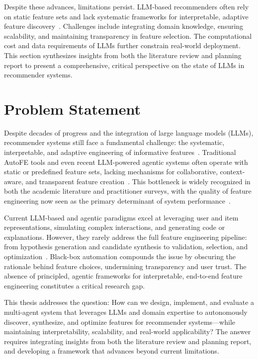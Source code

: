 Despite these advances, limitations persist. LLM-based recommenders often rely on static feature sets and lack systematic frameworks for interpretable, adaptive feature discovery~\cite{litterature_review}. Challenges include integrating domain knowledge, ensuring scalability, and maintaining transparency in feature selection. The computational cost and data requirements of LLMs further constrain real-world deployment. This section synthesizes insights from both the literature review and planning report to present a comprehensive, critical perspective on the state of LLMs in recommender systems.


\section{Problem Statement}
Despite decades of progress and the integration of large language models (LLMs), recommender systems still face a fundamental challenge: the systematic, interpretable, and adaptive engineering of informative features~\cite{litterature_review,Planning_Report}. Traditional AutoFE tools and even recent LLM-powered agentic systems often operate with static or predefined feature sets, lacking mechanisms for collaborative, context-aware, and transparent feature creation~\cite{Kanter2015Featuretools,Zou2025FEBP,Wang2024RecMind}. This bottleneck is widely recognized in both the academic literature and practitioner surveys, with the quality of feature engineering now seen as the primary determinant of system performance~\cite{litterature_review}.

Current LLM-based and agentic paradigms excel at leveraging user and item representations, simulating complex interactions, and generating code or explanations. However, they rarely address the full feature engineering pipeline: from hypothesis generation and candidate synthesis to validation, selection, and optimization~\cite{Wang2023LLMAgentsSurvey,Planning_Report}. Black-box automation compounds the issue by obscuring the rationale behind feature choices, undermining transparency and user trust. The absence of principled, agentic frameworks for interpretable, end-to-end feature engineering constitutes a critical research gap.

This thesis addresses the question: How can we design, implement, and evaluate a multi-agent system that leverages LLMs and domain expertise to autonomously discover, synthesize, and optimize features for recommender systems—while maintaining interpretability, scalability, and real-world applicability? The answer requires integrating insights from both the literature review and planning report, and developing a framework that advances beyond current limitations.

